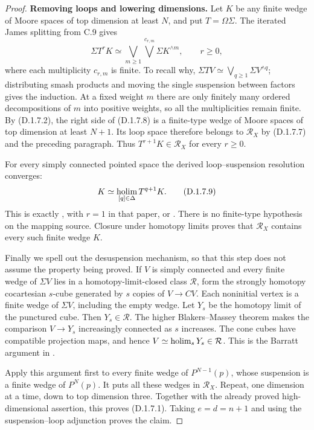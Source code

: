 \begin{proof}
\medskip\noindent
\textbf{Removing loops and lowering dimensions.}
Let $K$ be any finite wedge of Moore spaces of top dimension at
least $N$, and put $T=\Omega\Sigma$. The iterated James splitting
from C.9 gives
\[
 \Sigma T^rK\simeq
       \bigvee_{m\geq1}\bigvee^{c_{r,m}}\Sigma K^{\wedge m},
       \qquad r\geq0,                              \tag{D.1.7.8}
\]
where each multiplicity $c_{r,m}$ is finite. To recall why,
$\Sigma TV\simeq\bigvee_{q\geq1}\Sigma V^{\wedge q}$;
distributing smash products and moving the single suspension
between factors gives the induction. At a fixed weight $m$
there are only finitely many ordered decompositions of $m$ into
positive weights, so all the multiplicities remain finite.
By (D.1.7.2), the right side of (D.1.7.8) is a finite-type wedge
of Moore spaces of top dimension at least $N+1$. Its loop space
therefore belongs to $\mathcal R_X$ by (D.1.7.7) and the preceding
paragraph. Thus $T^{r+1}K\in\mathcal R_X$ for every $r\geq0$.

For every simply connected pointed space the derived
loop--suspension resolution converges:
\[
             K\simeq\operatorname*{holim}_{[q]\in\Delta}T^{q+1}K.
 \tag{D.1.7.9}
\]
This is exactly \cite[Theorem~1.8(b)]{FGHBlomquistHarper2017},
with $r=1$ in that paper, or
\cite[Sections~7.9 and~9.9]{FGHBousfield2003}. There is no
finite-type hypothesis on the mapping source. Closure under
homotopy limits proves that $\mathcal R_X$ contains every such
finite wedge $K$.

Finally we spell out the desuspension mechanism, so that this
step does not assume the property being proved. If $V$ is simply
connected and every finite wedge of $\Sigma V$ lies in a
homotopy-limit-closed class $\mathcal R$, form the strongly
homotopy cocartesian $s$-cube generated by $s$ copies of
$V\to CV$. Each noninitial vertex is a finite wedge of
$\Sigma V$, including the empty wedge. Let $Y_s$ be the homotopy
limit of the punctured cube. Then $Y_s\in\mathcal R$.
The higher Blakers--Massey theorem makes the comparison
$V\to Y_s$ increasingly connected as $s$ increases. The cone
cubes have compatible projection maps, and hence
$V\simeq\operatorname*{holim}_sY_s\in\mathcal R$. This is the Barratt
argument in \cite[Theorem~8, p.~7]{I_Strom2012}.

Apply this argument first to every finite wedge of $P^{N-1}(p)$,
whose suspension is a finite wedge of $P^N(p)$. It puts all
these wedges in $\mathcal R_X$. Repeat, one dimension at a time,
down to top dimension three. Together with the already proved
high-dimensional assertion, this proves (D.1.7.1). Taking
$e=d=n+1$ and using the suspension--loop adjunction proves the
claim.
\end{proof}

